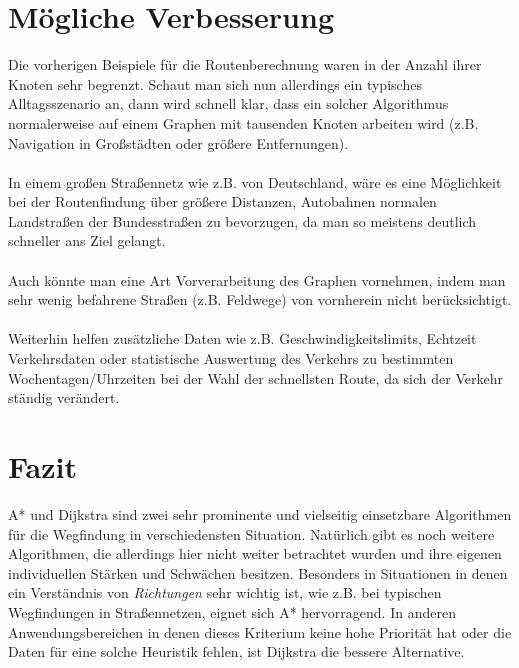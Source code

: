 \documentclass[11pt]{scrreprt}
\begin{document}
\chapter{Mögliche Verbesserung}
Die vorherigen Beispiele für die Routenberechnung waren in der Anzahl ihrer Knoten sehr begrenzt.
Schaut man sich nun allerdings ein typisches Alltagsszenario an, dann wird schnell klar, dass ein solcher Algorithmus normalerweise auf einem Graphen mit tausenden Knoten arbeiten wird (z.B. Navigation in Großstädten oder größere Entfernungen).
\\\\
In einem großen Straßennetz wie z.B. von Deutschland, wäre es eine Möglichkeit bei der Routenfindung über größere Distanzen, Autobahnen normalen Landstraßen der Bundesstraßen zu bevorzugen, da man so meistens deutlich schneller ans Ziel gelangt.
\\\\
Auch könnte man eine Art Vorverarbeitung des Graphen vornehmen, indem man sehr wenig befahrene Straßen (z.B. Feldwege) von vornherein nicht berücksichtigt.
\\\\
Weiterhin helfen zusätzliche Daten wie z.B. Geschwindigkeitslimits, Echtzeit Verkehrsdaten oder statistische Auswertung des Verkehrs zu bestimmten Wochentagen/Uhrzeiten bei der Wahl der schnellsten Route, da sich der Verkehr ständig verändert.

\chapter{Fazit}
A* und Dijkstra sind zwei sehr prominente und vielseitig einsetzbare Algorithmen für die Wegfindung in verschiedensten Situation.
Natürlich gibt es noch weitere Algorithmen, die allerdings hier nicht weiter betrachtet wurden und ihre eigenen individuellen Stärken und Schwächen besitzen.
Besonders in Situationen in denen ein Verständnis von \textit{Richtungen} sehr wichtig ist, wie z.B. bei typischen Wegfindungen in Straßennetzen, eignet sich A* hervorragend.
In anderen Anwendungsbereichen in denen dieses Kriterium keine hohe Priorität hat oder die Daten für eine solche Heuristik fehlen, ist Dijkstra die bessere Alternative.

\printbibliography 
\end{document}
